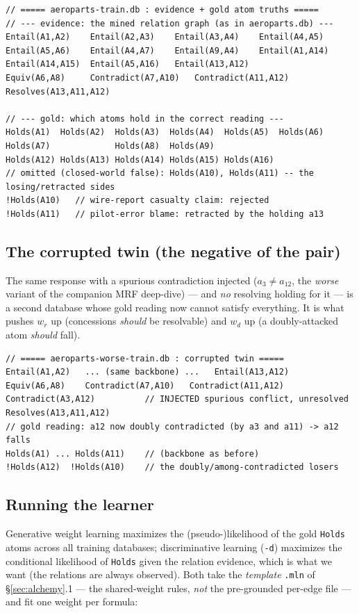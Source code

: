 \documentclass[11pt]{article}
\begin{document}
\begin{lstlisting}[style=mln]
// ===== aeroparts-train.db : evidence + gold atom truths =====
// --- evidence: the mined relation graph (as in aeroparts.db) ---
Entail(A1,A2)    Entail(A2,A3)    Entail(A3,A4)    Entail(A4,A5)
Entail(A5,A6)    Entail(A4,A7)    Entail(A9,A4)    Entail(A1,A14)
Entail(A14,A15)  Entail(A5,A16)   Entail(A13,A12)
Equiv(A6,A8)     Contradict(A7,A10)   Contradict(A11,A12)
Resolves(A13,A11,A12)

// --- gold: which atoms hold in the correct reading ---
Holds(A1)  Holds(A2)  Holds(A3)  Holds(A4)  Holds(A5)  Holds(A6)
Holds(A7)             Holds(A8)  Holds(A9)
Holds(A12) Holds(A13) Holds(A14) Holds(A15) Holds(A16)
// omitted (closed-world false): Holds(A10), Holds(A11) -- the losing/retracted sides
!Holds(A10)   // wire-report casualty claim: rejected
!Holds(A11)   // pilot-error blame: retracted by the holding a13
\end{lstlisting}

\subsection{The corrupted twin (the negative of the pair)}
The same response with a spurious contradiction injected ($a_3\!\neq\!a_{12}$, the
\emph{worse} variant of the companion MRF deep-dive) --- and \emph{no} resolving holding for
it --- is a second database whose gold reading now cannot satisfy everything. It is what
pushes $w_r$ up (concessions \emph{should} be resolvable) and $w_d$ up (a doubly-attacked
atom \emph{should} fall).

\begin{lstlisting}[style=mln]
// ===== aeroparts-worse-train.db : corrupted twin =====
Entail(A1,A2)   ... (same backbone) ...   Entail(A13,A12)
Equiv(A6,A8)    Contradict(A7,A10)   Contradict(A11,A12)
Contradict(A3,A12)          // INJECTED spurious conflict, unresolved
Resolves(A13,A11,A12)
// gold reading: a12 now doubly contradicted (by a3 and a11) -> a12 falls
Holds(A1) ... Holds(A11)    // (backbone as before)
!Holds(A12)  !Holds(A10)    // the doubly/among-contradicted losers
\end{lstlisting}

\subsection{Running the learner}
Generative weight learning maximizes the (pseudo-)likelihood of the gold \texttt{Holds}
atoms across all training databases; discriminative learning (\texttt{-d}) maximizes the
conditional likelihood of \texttt{Holds} given the relation evidence, which is what we want
(the relations are always observed). Both take the \emph{template} \texttt{.mln} of
\S\ref{sec:alchemy}.1 --- the shared-weight rules, \emph{not} the pre-grounded per-edge file
--- and fit one weight per formula:
\end{document}
